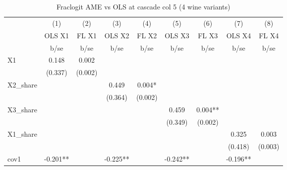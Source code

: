 \begin{table}[htbp]\centering
\def\sym#1{\ifmmode^{#1}\else\(^{#1}\)\fi}
\caption{Fraclogit AME vs OLS at cascade col 5 (4 wine variants) \label{tab:flvsols}}
\begin{tabular}{l*{8}{c}}
\toprule
            &\multicolumn{1}{c}{(1)}&\multicolumn{1}{c}{(2)}&\multicolumn{1}{c}{(3)}&\multicolumn{1}{c}{(4)}&\multicolumn{1}{c}{(5)}&\multicolumn{1}{c}{(6)}&\multicolumn{1}{c}{(7)}&\multicolumn{1}{c}{(8)}\\
            &\multicolumn{1}{c}{OLS X1}&\multicolumn{1}{c}{FL X1}&\multicolumn{1}{c}{OLS X2}&\multicolumn{1}{c}{FL X2}&\multicolumn{1}{c}{OLS X3}&\multicolumn{1}{c}{FL X3}&\multicolumn{1}{c}{OLS X4}&\multicolumn{1}{c}{FL X4}\\
            &        b/se   &        b/se   &        b/se   &        b/se   &        b/se   &        b/se   &        b/se   &        b/se   \\
\midrule
X1          &       0.148   &       0.002   &               &               &               &               &               &               \\
            &     (0.337)   &     (0.002)   &               &               &               &               &               &               \\
X2\_share    &               &               &       0.449   &       0.004*  &               &               &               &               \\
            &               &               &     (0.364)   &     (0.002)   &               &               &               &               \\
X3\_share    &               &               &               &               &       0.459   &       0.004** &               &               \\
            &               &               &               &               &     (0.349)   &     (0.002)   &               &               \\
X1\_share    &               &               &               &               &               &               &       0.325   &       0.003   \\
            &               &               &               &               &               &               &     (0.418)   &     (0.003)   \\
cov1        &      -0.201** &               &      -0.225** &               &      -0.242** &               &      -0.196** &               \\

\end{tabular}
\end{table}

